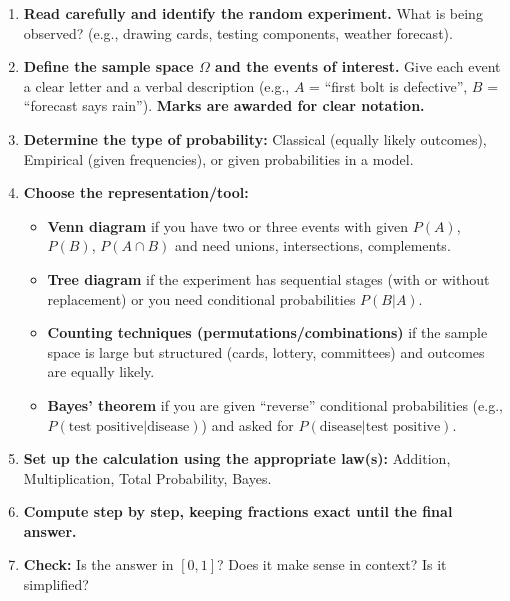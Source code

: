 \documentclass[11pt]{article}
\begin{document}
\begin{methode}
\begin{enumerate}
    \item \textbf{Read carefully and identify the random experiment.} What is being observed? (e.g., drawing cards, testing components, weather forecast).
    \item \textbf{Define the sample space $\Omega$ and the events of interest.} Give each event a clear letter and a verbal description (e.g., $A$ = ``first bolt is defective'', $B$ = ``forecast says rain''). \textbf{Marks are awarded for clear notation.}
    \item \textbf{Determine the type of probability:} Classical (equally likely outcomes), Empirical (given frequencies), or given probabilities in a model.
    \item \textbf{Choose the representation/tool:}
        \begin{itemize}
            \item \textbf{Venn diagram} if you have two or three events with given $P(A)$, $P(B)$, $P(A\cap B)$ and need unions, intersections, complements.
            \item \textbf{Tree diagram} if the experiment has sequential stages (with or without replacement) or you need conditional probabilities $P(B|A)$.
            \item \textbf{Counting techniques (permutations/combinations)} if the sample space is large but structured (cards, lottery, committees) and outcomes are equally likely.
            \item \textbf{Bayes' theorem} if you are given ``reverse'' conditional probabilities (e.g., $P(\text{test positive} | \text{disease})$) and asked for $P(\text{disease} | \text{test positive})$.
        \end{itemize}
    \item \textbf{Set up the calculation using the appropriate law(s):} Addition, Multiplication, Total Probability, Bayes.
    \item \textbf{Compute step by step, keeping fractions exact until the final answer.}
    \item \textbf{Check:} Is the answer in $[0,1]$? Does it make sense in context? Is it simplified?
\end{enumerate}
\end{methode}
\end{document}
